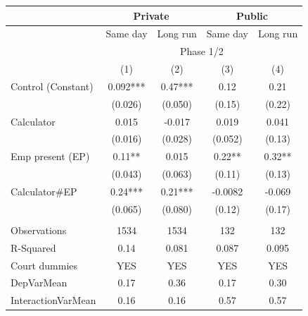 \begin{tabular}{lcccc}
\toprule
\multicolumn{1}{r|}{} & \multicolumn{2}{c|}{Private} & \multicolumn{2}{c|}{Public} \\
\midrule
      & Same day  & Long run & Same day  & Long run \\
\midrule
      & \multicolumn{4}{c}{Phase 1/2} \\
\midrule
\midrule
      & (1)   & (2)   & (3)   & (4) \\
\midrule
\midrule
Control (Constant)  & 0.092*** & 0.47*** & 0.12  & 0.21 \\
 & (0.026) & (0.050) & (0.15) & (0.22) \\
Calculator   & 0.015 & -0.017 & 0.019 & 0.041 \\
      & (0.016) & (0.028) & (0.052) & (0.13) \\
Emp present (EP) & 0.11** & 0.015 & 0.22** & 0.32** \\
      & (0.043) & (0.063) & (0.11) & (0.13) \\
Calculator\#EP & 0.24*** & 0.21*** & -0.0082 & -0.069 \\
      & (0.065) & (0.080) & (0.12) & (0.17) \\
      &       &       &       &  \\
\midrule
Observations & 1534  & 1534  & 132   & 132 \\
R-Squared & 0.14  & 0.081 & 0.087 & 0.095 \\
Court dummies & YES   & YES   & YES   & YES \\
DepVarMean & 0.17  & 0.36  & 0.17  & 0.30 \\
InteractionVarMean & 0.16  & 0.16  & 0.57  & 0.57 \\
\bottomrule
\bottomrule
\end{tabular}%
